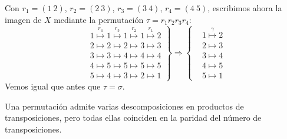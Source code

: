 \begin{ejemplo}
    Con $r_1 = (1\ 2)$, $r_2 = (2\ 3)$, $r_3 = (3\ 4)$, $r_4 = (4\ 5)$, escribimos ahora la imagen de $X$ mediante la permutación $\tau=r_1r_2r_3r_4$:
    \begin{equation*}
        \left.\begin{array}{cc}
            &1 \stackrel{r_4}{\longmapsto} 1 \stackrel{r_3}{\longmapsto} 1 \stackrel{r_2}{\longmapsto} 1 \stackrel{r_1}{\longmapsto} 2 \\
            &2 \longmapsto 2 \longmapsto 2 \longmapsto 3 \longmapsto 3 \\
            &3 \longmapsto 3 \longmapsto 4 \longmapsto 4 \longmapsto 4 \\
            &4 \longmapsto 5 \longmapsto 5 \longmapsto 5 \longmapsto 5 \\
            &5 \longmapsto 4 \longmapsto 3 \longmapsto 2 \longmapsto 1 
        \end{array}\right\} \Longrightarrow \left\{\begin{array}{cc}
            &1 \stackrel{\gamma}{\longmapsto} 2 \\
            &2 \longmapsto 3 \\
            &3 \longmapsto 4 \\
            &4 \longmapsto 5 \\
            &5 \longmapsto 1 
        \end{array}\right.
    \end{equation*}
    Vemos igual que antes que $\tau = \sigma$.
\end{ejemplo}

\begin{prop}\label{prop:paridad_transposiciones}
    Una permutación admite varias descomposiciones en productos de transposiciones, pero todas ellas coinciden en la paridad del número de transposiciones.
\end{prop}


